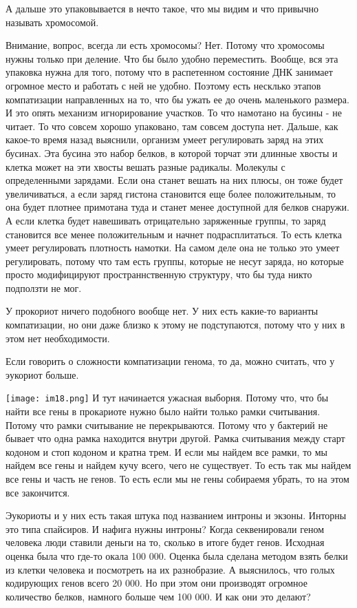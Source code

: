 А дальше это упаковывается в нечто такое, что мы видим и что привычно называть 
хромосомой. 

Внимание, вопрос, всегда ли есть хромосомы? 
Нет. Потому что хромосомы нужны только при деление. 
Что бы было удобно переместить. Вообще, вся эта упаковка нужна 
для того, потому что в распетенном состояние ДНК занимает огромное 
место и работать с ней не удобно. Поэтому есть несклько 
этапов компатизации направленных на то, 
что бы ужать ее до очень маленького размера. И это 
опять механизм игнорирование участков. То что намотано на бусины - не читает. 
То что совсем хорошо упаковано, там совсем доступа нет. Дальше, как какое-то 
время назад выяснили, организм умеет регулировать заряд на 
этих бусинах. Эта бусина это набор белков, 
в которой торчат эти длинные хвосты и клетка может на эти хвосты вешать 
разные радикалы. Молекулы с определенными зарядами. Если она станет 
вешать на них плюсы, он тоже будет увеличиваться, 
а если заряд гистона становится еще более положительным, то она будет 
плотнее примотана туда и станет менее доступной для белков снаружи. 
А если клетка будет навешивать отрицательно 
заряженные группы, то заряд становится все 
менее положительным и начнет подрасплитаться. То есть 
клетка умеет регулировать плотность намотки. 
На самом деле она не только это умеет регулировать, 
потому что там есть группы, которые не несут заряда, но 
которые просто модифицируют пространнственную 
структуру, что бы туда никто подползти не мог. 


У прокориот ничего подобного вообще нет. У них есть какие-то варианты 
компатизации, но они даже близко к этому не подступаются, 
потому что у них в этом нет необходимости. 

Если говорить о сложности компатизации генома, то да, 
можно считать, что у эукориот больше. 

\texttt{[image: im18.png]}
И тут начинается ужасная выборня. Потому что, 
что бы найти все гены в прокариоте нужно было 
найти только рамки считывания. Потому что 
рамки считывание не перекрываются. Потому что 
у бактерий не бывает что одна рамка находится внутри другой. 
Рамка считывания между старт кодоном и стоп кодоном и кратна трем. 
И если мы найдем все рамки, то мы  найдем все гены и найдем кучу всего, 
чего не существует. То есть так мы найдем все гены и 
часть не генов. То есть если мы не гены собираемя убрать, то 
на этом все закончится. 

Эукориоты и у них есть такая штука под названием интроны и экзоны. 
Инторны это типа спайсиров. И нафига нужны интроны? Когда 
секвенировали геном человека люди ставили деньги на то, 
сколько в итоге будет генов. Исходная оценка была что 
где-то окала 100 000. Оценка была сделана методом 
взять белки из клетки человека и посмотреть на их 
разнобразие. А выяснилось, что 
голых кодирующих генов всего 
20 000. Но при этом они производят 
огромное количество белков, намного больше чем 100 000. 
И как они это делают? 

